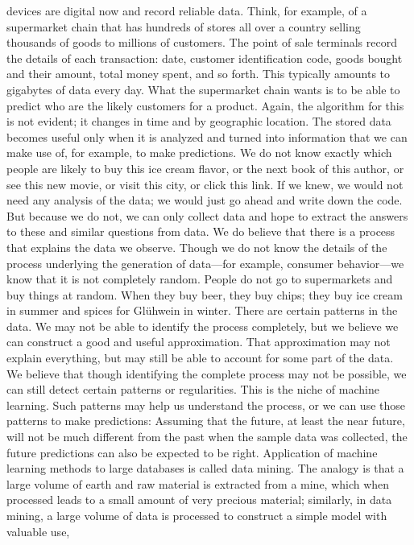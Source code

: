 devices are digital now and record reliable data. Think, for example, of a supermarket chain that has hundreds of stores all over a country selling thousands of goods to millions of customers. The point of sale terminals record the details of each transaction: date, customer identification code, goods bought and their amount, total money spent, and so forth. This typically amounts to gigabytes of data every day. What the supermarket chain wants is to be able to predict who are the likely customers for a product. Again, the algorithm for this is not evident; it changes in time and by geographic location. The stored data becomes useful only when it is analyzed and turned into information that we can make use of, for example, to make predictions. We do not know exactly which people are likely to buy this ice cream flavor, or the next book of this author, or see this new movie, or visit this city, or click this link. If we knew, we would not need any analysis of the data; we would just go ahead and write down the code. But because we do not, we can only collect data and hope to extract the answers to these and similar questions from data. We do believe that there is a process that explains the data we observe. Though we do not know the details of the process underlying the generation of data---for example, consumer behavior---we know that it is not completely random. People do not go to supermarkets and buy things at random. When they buy beer, they buy chips; they buy ice cream in summer and spices for Glühwein in winter. There are certain patterns in the data. We may not be able to identify the process completely, but we believe we can construct a good and useful approximation. That approximation may not explain everything, but may still be able to account for some part of the data. We believe that though identifying the complete process may not be possible, we can still detect certain patterns or regularities. This is the niche of machine learning. Such patterns may help us understand the process, or we can use those patterns to make predictions: Assuming that the future, at least the near future, will not be much different from the past when the sample data was collected, the future predictions can also be expected to be right. Application of machine learning methods to large databases is called data mining. The analogy is that a large volume of earth and raw material is extracted from a mine, which when processed leads to a small amount of very precious material; similarly, in data mining, a large volume of data is processed to construct a simple model with valuable use,

